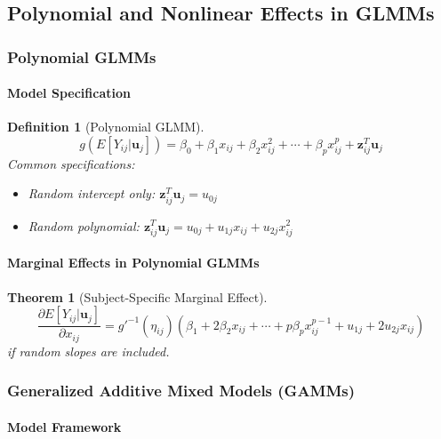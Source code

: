 \documentclass{article}
\newtheorem{definition}{Definition}
\newtheorem{theorem}{Theorem}
\begin{document}
\subsection{Polynomial and Nonlinear Effects in GLMMs}

\subsubsection{Polynomial GLMMs}

\paragraph{Model Specification}

\begin{definition}[Polynomial GLMM]
\begin{equation}
g(E[Y_{ij}|\mathbf{u}_j]) = \beta_0 + \beta_1 x_{ij} + \beta_2 x_{ij}^2 + \cdots + \beta_p x_{ij}^p + \mathbf{z}_{ij}^T\mathbf{u}_j
\end{equation}
Common specifications:
\begin{itemize}
    \item Random intercept only: $\mathbf{z}_{ij}^T\mathbf{u}_j = u_{0j}$
    \item Random polynomial: $\mathbf{z}_{ij}^T\mathbf{u}_j = u_{0j} + u_{1j}x_{ij} + u_{2j}x_{ij}^2$
\end{itemize}
\end{definition}

\paragraph{Marginal Effects in Polynomial GLMMs}

\begin{theorem}[Subject-Specific Marginal Effect]
\begin{equation}
\frac{\partial E[Y_{ij}|\mathbf{u}_j]}{\partial x_{ij}} = g'^{-1}(\eta_{ij})\left(\beta_1 + 2\beta_2 x_{ij} + \cdots + p\beta_p x_{ij}^{p-1} + u_{1j} + 2u_{2j}x_{ij}\right)
\end{equation}
if random slopes are included.
\end{theorem}

\subsubsection{Generalized Additive Mixed Models (GAMMs)}

\paragraph{Model Framework}
\end{document}
